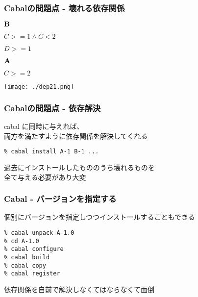 \documentclass[cjk,dvipdfm,14pt]{beamer}
\begin{document}
\begin{frame}
\frametitle{Cabalの問題点 - 壊れる依存関係}

\begin{description}
\item ${\bf B}$
\item
  \begin{description}
  \item $C >= 1 \wedge C < 2$
  \item $D >= 1$
  \end{description}
\end{description}

\begin{description}
\item ${\bf A}$
\item
  \begin{description}
  \item $C >= 2$
  \end{description}
\end{description}

\texttt{[image: ./dep21.png]}

\end{frame}

\begin{frame}[fragile]
\frametitle{Cabalの問題点 - 依存解決}

cabal に同時に与えれば、\\両方を満たすように依存関係を解決してくれる

\begin{lstlisting}
% cabal install A-1 B-1 ...
\end{lstlisting}

過去にインストールしたもののうち壊れるものを\\全て与える必要があり大変

\end{frame}


\begin{frame}[fragile]
\frametitle{Cabal - バージョンを指定する}

個別にバージョンを指定しつつインストールすることもできる

\begin{lstlisting}
% cabal unpack A-1.0
% cd A-1.0
% cabal configure
% cabal build
% cabal copy
% cabal register
\end{lstlisting}

依存関係を自前で解決しなくてはならなくて面倒

\end{frame}
\end{document}
